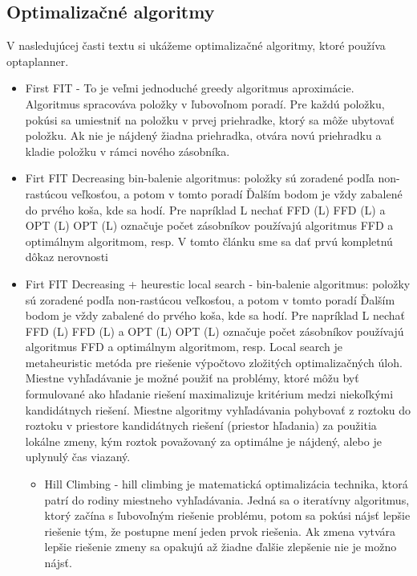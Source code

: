 \subsection{Optimalizačné algoritmy}
V nasledujúcej časti textu si ukážeme optimalizačné algoritmy, ktoré používa optaplanner.
\begin{itemize}
\item First FIT - To je veľmi jednoduché greedy algoritmus aproximácie. Algoritmus spracováva položky v ľubovoľnom poradí. Pre každú položku, pokúsi sa umiestniť na položku v prvej priehradke, ktorý sa môže ubytovať položku. Ak nie je nájdený žiadna priehradka, otvára novú priehradku a kladie položku v rámci nového zásobníka.

\item Firt FIT Decreasing  bin-balenie algoritmus: položky sú zoradené podľa non-rastúcou veľkosťou, a potom v tomto poradí Ďalším bodom je vždy zabalené do prvého koša, kde sa hodí. Pre napríklad L nechať FFD (L) FFD (L) a OPT (L) OPT (L) označuje počet zásobníkov používajú algoritmus FFD a optimálnym algoritmom, resp. V tomto článku sme sa dať prvú kompletnú dôkaz nerovnosti
\item Firt FIT Decreasing + heurestic local search -  bin-balenie algoritmus: položky sú zoradené podľa non-rastúcou veľkosťou, a potom v tomto poradí Ďalším bodom je vždy zabalené do prvého koša, kde sa hodí. Pre napríklad L nechať FFD (L) FFD (L) a OPT (L) OPT (L) označuje počet zásobníkov používajú algoritmus FFD a optimálnym algoritmom, resp. Local search  je metaheuristic metóda pre riešenie výpočtovo zložitých optimalizačných úloh. Miestne vyhľadávanie je možné použiť na problémy, ktoré môžu byť formulované ako hľadanie riešení maximalizuje kritérium medzi niekoľkými kandidátnych riešení. Miestne algoritmy vyhľadávania pohybovať z roztoku do roztoku v priestore kandidátnych riešení (priestor hľadania) za použitia lokálne zmeny, kým roztok považovaný za optimálne je nájdený, alebo je uplynulý čas viazaný.

\begin{itemize}
\item Hill Climbing - hill climbing je matematická optimalizácia technika, ktorá patrí do rodiny miestneho vyhľadávania. Jedná sa o iteratívny algoritmus, ktorý začína s ľubovoľným riešenie problému, potom sa pokúsi nájsť lepšie riešenie tým, že postupne mení jeden prvok riešenia. Ak zmena vytvára lepšie riešenie zmeny sa opakujú až žiadne ďalšie zlepšenie nie je možno nájsť.\cite{algobook}





\end{itemize}
\end{itemize}
